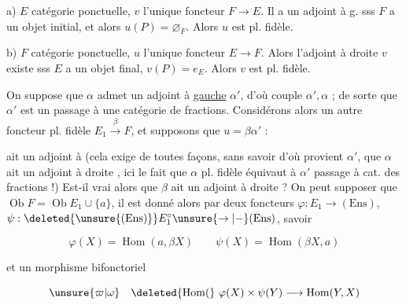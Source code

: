 a) $E$ catégorie ponctuelle, $v$ l'unique foncteur $F\to E$. Il a un adjoint à g.  sss $F$ a un objet initial, et alors $u(P)=\varnothing_F$. Alors $u$ est pl. fidèle.

b) $F$ catégorie ponctuelle, $u$ l'unique foncteur $E\to F$. Alors l'adjoint à droite $v$ existe sss $E$ a un objet final, $v(P)=e_E$. Alors $v$ est pl. fidèle.


On suppose que $\alpha$ admet un adjoint à \uline{gauche} $\alpha'$, d'où couple $\alpha',\alpha$ ;  de sorte que $\alpha'$ est un passage à une catégorie de fractions. Considérons alors un autre foncteur pl. fidèle $E_1\xrightarrow{\beta} F$, et supposons que $u=\beta\alpha'$ :


ait un adjoint à  (cela exige de toutes façons, sans savoir d'où provient $\alpha'$, que $\alpha$ ait un adjoint à droite \inserted{$\unsure{\alpha|\gamma}$},  ici le fait que $\alpha$ pl. fidèle équivaut à $\alpha'$ passage à cat. des fractions !) Est-il vrai alors que $\beta$ ait un adjoint à droite ? On peut supposer que  $\operatorname{Ob}F=\operatorname{Ob}E_1\cup\{a\}$, il est donné alors par deux foncteurs $\varphi:E_1\to(\mathrm{Ens})$, $\psi:\deleted{\unsure{(\mathrm{Ens})}}E_1^{\circ}\unsure{\to|{-}}(\mathrm{Ens})$, savoir

\[\varphi(X)=\operatorname{Hom}(a,\beta X)\qquad\psi(X)=\operatorname{Hom}(\beta X,a)\]

et un morphisme bifonctoriel

\[\unsure{\varpi|\omega}\quad\deleted{\operatorname{Hom}(}\ \varphi(X)\times\psi(Y)\longrightarrow\operatorname{Hom}(Y,X)\]

